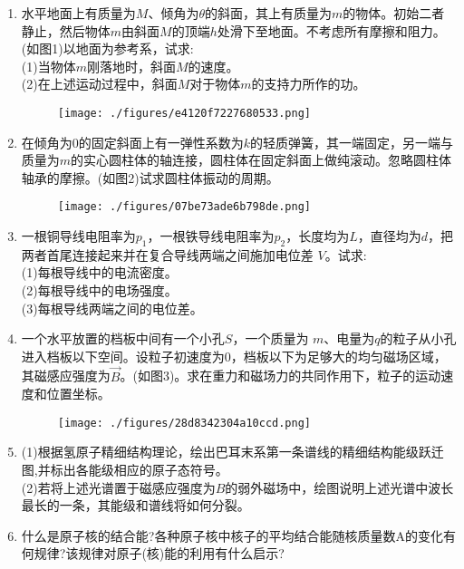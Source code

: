 
\begin{enumerate}
\item 水平地面上有质量为$M$、倾角为$\theta$的斜面，其上有质量为$m$的物体。初始二者静止，然后物体$m$由斜面$M$的顶端$h$处滑下至地面。不考虑所有摩擦和阻力。(如图1)以地面为参考系，试求:\\
(1)当物体$m$刚落地时，斜面$M$的速度。\\
(2)在上述运动过程中，斜面$M$对于物体$m$的支持力所作的功。
\begin{figure}[ht]
\centering
\texttt{[image: ./figures/e4120f7227680533.png]}
\caption{} \label{fig_SSDPEE_1}
\end{figure}
\item 在倾角为0的固定斜面上有一弹性系数为$k$的轻质弹簧，其一端固定，另一端与质量为$m$的实心圆柱体的轴连接，圆柱体在固定斜面上做纯滚动。忽略圆柱体轴承的摩擦。(如图2)试求圆柱体振动的周期。
\begin{figure}[ht]
\centering
\texttt{[image: ./figures/07be73ade6b798de.png]}
\caption{} \label{fig_SSDPEE_2}
\end{figure}
\item 一根铜导线电阻率为$p_1$，一根铁导线电阻率为$p_2$，长度均为$L$，直径均为$d$，把两者首尾连接起来并在复合导线两端之间施加电位差 $V$。试求:\\
(1)每根导线中的电流密度。\\
(2)每根导线中的电场强度。\\
(3)每根导线两端之间的电位差。
\item 一个水平放置的档板中间有一个小孔$S$，一个质量为 $m$、电量为$q$的粒子从小孔进入档板以下空间。设粒子初速度为0，档板以下为足够大的均匀磁场区域，其磁感应强度为$\vec{B}$。(如图3)。求在重力和磁场力的共同作用下，粒子的运动速度和位置坐标。
\begin{figure}[ht]
\centering
\texttt{[image: ./figures/28d8342304a10ccd.png]}
\caption{} \label{fig_SSDPEE_3}
\end{figure}
\item (1)根据氢原子精细结构理论，绘出巴耳末系第一条谱线的精细结构能级跃迁图,并标出各能级相应的原子态符号。\\
(2)若将上述光谱置于磁感应强度为$B$的弱外磁场中，绘图说明上述光谱中波长最长的一条，其能级和谱线将如何分裂。
\item 什么是原子核的结合能?各种原子核中核子的平均结合能随核质量数A的变化有何规律?该规律对原子(核)能的利用有什么启示?
\end{enumerate}